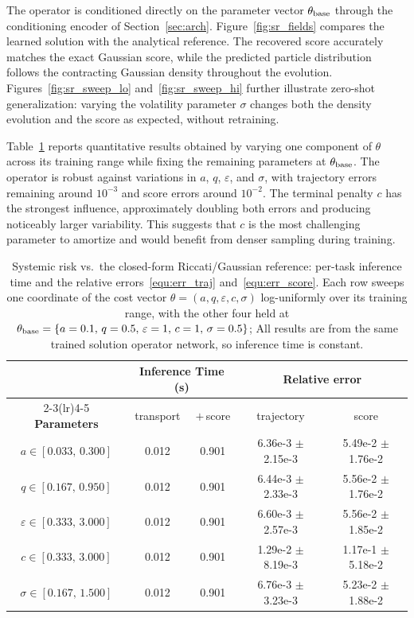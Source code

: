 \documentclass[preprint]{elsarticle}
\begin{document}
The operator is conditioned directly on the parameter vector $\theta_{\rm base}$ through the conditioning encoder of Section~\ref{sec:arch}. Figure~\ref{fig:sr_fields} compares the learned solution with the analytical reference. The recovered score accurately matches the exact Gaussian score, while the predicted particle distribution follows the contracting Gaussian density throughout the evolution. Figures~\ref{fig:sr_sweep_lo} and~\ref{fig:sr_sweep_hi} further illustrate zero-shot generalization: varying the volatility parameter $\sigma$ changes both the density evolution and the score as expected, without retraining.

Table~\ref{tab:sr_error} reports quantitative results obtained by varying one component of $\theta$ across its training range while fixing the remaining parameters at $\theta_{\rm base}$. The operator is robust against variations in $a$, $q$, $\varepsilon$, and $\sigma$, with trajectory errors remaining around $10^{-3}$ and score errors around $10^{-2}$. The terminal penalty $c$ has the strongest influence, approximately doubling both errors and producing noticeably larger variability. This suggests that $c$ is the most challenging parameter to amortize and would benefit from denser sampling during training.


\begin{table}[!htpb]
    \centering
    \caption{Systemic risk vs.\ the closed-form Riccati/Gaussian reference:
    per-task inference time and the relative errors~\eqref{equ:err_traj}
    and~\eqref{equ:err_score}.
    Each row sweeps one coordinate of the cost vector
    $\theta=(a,q,\varepsilon,c,\sigma)$ log-uniformly over its training range,
    with the other four held at $\theta_{\rm base}=\{a=0.1,\,q=0.5,\,\varepsilon=1,\,c=1,\,\sigma=0.5\}$;
    All results are from the same trained solution operator network, so inference time is constant.}
    \label{tab:sr_error}
    \begin{tabular}{ccccc}
        \toprule
         & \multicolumn{2}{c}{\textbf{Inference Time (s)}}
            & \multicolumn{2}{c}{\textbf{Relative error}} \\
        \cmidrule(lr){2-3}\cmidrule(lr){4-5}
        \textbf{Parameters} & transport & $+$\,score
            & trajectory & score \\
        \midrule
        $a\in[0.033,\,0.300]$ & 0.012 & 0.901 & 6.36e-3 $\pm$ 2.15e-3 & 5.49e-2 $\pm$ 1.76e-2 \\
        $q\in[0.167,\,0.950]$ & 0.012 & 0.901 & 6.44e-3 $\pm$ 2.33e-3 & 5.56e-2 $\pm$ 1.76e-2 \\
        $\varepsilon\in[0.333,\,3.000]$ & 0.012 & 0.901 & 6.60e-3 $\pm$ 2.57e-3 & 5.56e-2 $\pm$ 1.85e-2 \\
        $c\in[0.333,\,3.000]$ & 0.012 & 0.901 & 1.29e-2 $\pm$ 8.19e-3 & 1.17e-1 $\pm$ 5.18e-2 \\
        $\sigma\in[0.167,\,1.500]$ & 0.012 & 0.901 & 6.76e-3 $\pm$ 3.23e-3 & 5.23e-2 $\pm$ 1.88e-2 \\
        \bottomrule
    \end{tabular}
\end{table}
\end{document}
